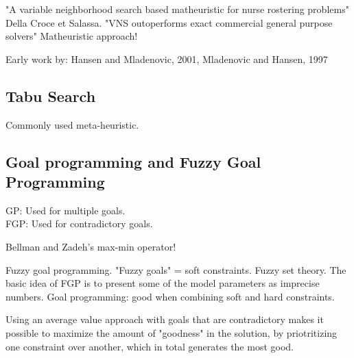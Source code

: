 "A variable neighborhood search based matheuristic for nurse rostering problems" Della Croce et Salassa. "VNS outoperforms exact commercial general purpose solvers"
Matheuristic approach!

Early work by:
Hansen  and  Mladenovic, 2001, Mladenovic and Hansen, 1997

\subsection{Tabu Search}

Commonly used meta-heuristic.

\subsection{Goal programming and Fuzzy Goal Programming}

GP: Used for multiple goals. \\
FGP: Used for contradictory goals.

Bellman and Zadeh's max-min operator!

Fuzzy goal programming.  "Fuzzy goals" = soft constraints. Fuzzy set theory. The basic idea of FGP is to present some of the model parameters as imprecise numbers.
Goal programming: good when combining soft and hard constraints.

Using an average value approach with goals that are contradictory makes it possible to maximize the amount of "goodness" in the solution, by priotritizing one constraint over another, which in total generates the most good.


\fi